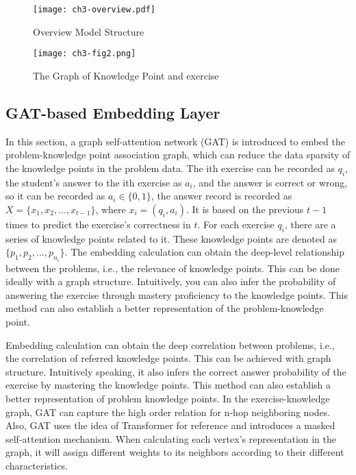 \begin{figure}[htbp!]
    \centering
    \texttt{[image: ch3-overview.pdf]}
    \caption{Overview Model Structure}\label{fig:ch3-fig1}
\end{figure}
\begin{figure}[htbp!]
    \centering
    \texttt{[image: ch3-fig2.png]}
    \caption{The Graph of Knowledge Point and exercise}\label{fig:ch3-fig2}
\end{figure}


\subsection{GAT-based Embedding Layer}

In this section, a graph self-attention network (GAT) is introduced to embed the problem-knowledge point association graph, which can reduce the data sparsity of the knowledge points in the problem data. The ith exercise can be recorded as \(q_i\), the student's answer to the ith exercise as \(a_i\), and the answer is correct or wrong, so it can be recorded as \(a_i\in \{0,1\} \), the answer record is recorded as \(X=\{x_1,x_2,\ldots,x_{t-1}\} \), where \(x_i=(q_i,a_i)\). It is based on the previous \(t-1\) times to predict the exercise's correctness in \(t\). For each exercise \(q_i\), there are a series of knowledge points related to it. These knowledge points are denoted as \( \{p_1,p_2,\ldots,p_{n_i}\} \). The embedding calculation can obtain the deep-level relationship between the problems, i.e., the relevance of knowledge points. This can be done ideally with a graph structure. Intuitively, you can also infer the probability of answering the exercise through mastery proficiency to the knowledge points. This method can also establish a better representation of the problem-knowledge point.

Embedding calculation can obtain the deep correlation between problems, i.e., the correlation of referred knowledge points. This can be achieved with graph structure. Intuitively speaking, it also infers the correct answer probability of the exercise by mastering the knowledge points. This method can also establish a better representation of problem knowledge points. In the exercise-knowledge graph, GAT can capture the high order relation for n-hop neighboring nodes. Also, GAT uses the idea of Transformer for reference and introduces a masked self-attention mechanism. When calculating each vertex's representation in the graph, it will assign different weights to its neighbors according to their different characteristics.

